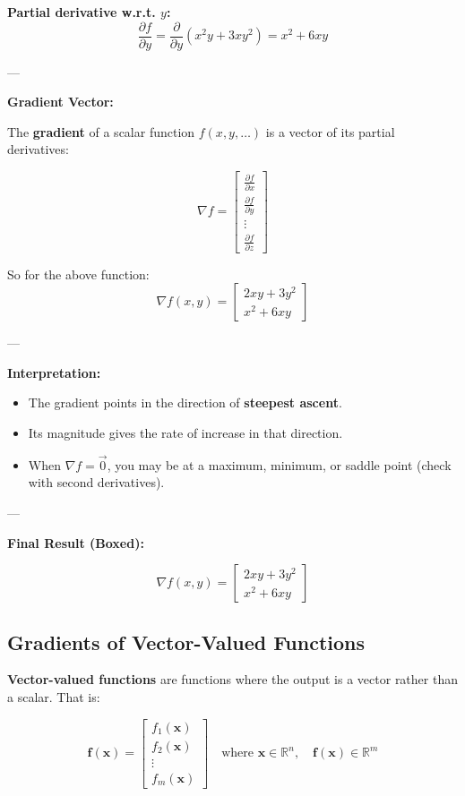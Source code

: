 \textbf{Partial derivative w.r.t. \(y\):}
\[
\frac{\partial f}{\partial y} = \frac{\partial}{\partial y}(x^2y + 3xy^2) = x^2 + 6xy
\]

---

\textbf{Gradient Vector:}

The \textbf{gradient} of a scalar function \( f(x, y, \dots) \) is a vector of its partial derivatives:

\[
\nabla f = 
\begin{bmatrix}
\frac{\partial f}{\partial x} \\
\frac{\partial f}{\partial y} \\
\vdots \\
\frac{\partial f}{\partial z}
\end{bmatrix}
\]

So for the above function:
\[
\nabla f(x, y) = 
\begin{bmatrix}
2xy + 3y^2 \\
x^2 + 6xy
\end{bmatrix}
\]

---

\textbf{Interpretation:}
\begin{itemize}
    \item The gradient points in the direction of \textbf{steepest ascent}.
    \item Its magnitude gives the rate of increase in that direction.
    \item When \( \nabla f = \vec{0} \), you may be at a maximum, minimum, or saddle point (check with second derivatives).
\end{itemize}

---

\textbf{Final Result (Boxed):}

\[
\boxed{
\nabla f(x, y) = 
\begin{bmatrix}
2xy + 3y^2 \\
x^2 + 6xy
\end{bmatrix}
}
\]


\subsection{Gradients of Vector-Valued Functions}

\textbf{Vector-valued functions} are functions where the output is a vector rather than a scalar. That is:

\[
\mathbf{f}(\mathbf{x}) = 
\begin{bmatrix}
f_1(\mathbf{x}) \\
f_2(\mathbf{x}) \\
\vdots \\
f_m(\mathbf{x})
\end{bmatrix}
\quad \text{where } \mathbf{x} \in \mathbb{R}^n, \quad \mathbf{f}(\mathbf{x}) \in \mathbb{R}^m
\]


